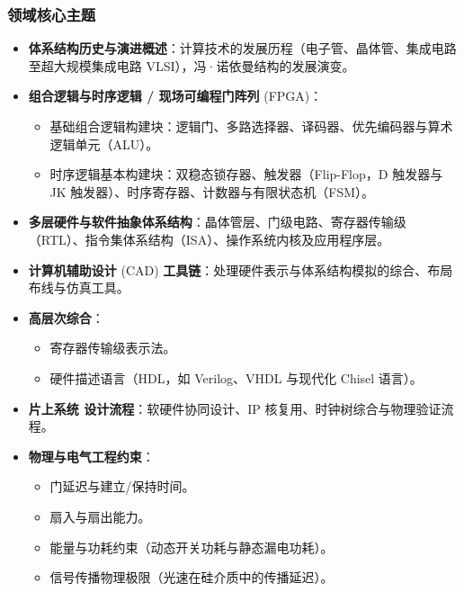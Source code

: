 \subsubsection{领域核心主题}
\begin{itemize}
    \item \textbf{体系结构历史与演进概述}：计算技术的发展历程（电子管、晶体管、集成电路至超大规模集成电路 VLSI），冯·诺依曼结构的发展演变。
    \item \textbf{组合逻辑与时序逻辑 / 现场可编程门阵列} (FPGA)：
    \begin{itemize}
        \item 基础组合逻辑构建块：逻辑门、多路选择器、译码器、优先编码器与算术逻辑单元（ALU）。
        \item 时序逻辑基本构建块：双稳态锁存器、触发器（Flip-Flop，D 触发器与 JK 触发器）、时序寄存器、计数器与有限状态机（FSM）。
    \end{itemize}
    \item \textbf{多层硬件与软件抽象体系结构}：晶体管层、门级电路、寄存器传输级（RTL）、指令集体系结构（ISA）、操作系统内核及应用程序层。
    \item \textbf{计算机辅助设计} (CAD) \textbf{工具链}：处理硬件表示与体系结构模拟的综合、布局布线与仿真工具。
    \item \textbf{高层次综合}：
    \begin{itemize}
        \item 寄存器传输级表示法。
        \item 硬件描述语言（HDL，如 Verilog、VHDL 与现代化 Chisel 语言）。
    \end{itemize}
    \item \textbf{片上系统 设计流程}：软硬件协同设计、IP 核复用、时钟树综合与物理验证流程。
    \item \textbf{物理与电气工程约束}：
    \begin{itemize}
        \item 门延迟与建立/保持时间。
        \item 扇入与扇出能力。
        \item 能量与功耗约束（动态开关功耗与静态漏电功耗）。
        \item 信号传播物理极限（光速在硅介质中的传播延迟）。
    \end{itemize}
\end{itemize}

